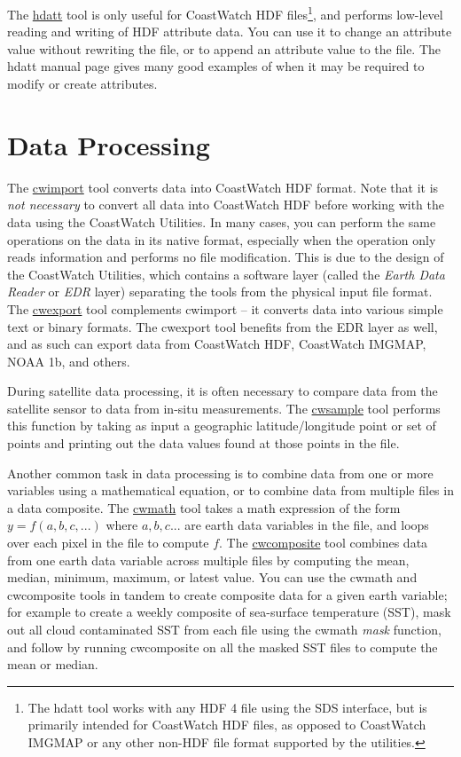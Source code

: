 The \hyperlink{hdatt}{hdatt} tool is only useful for CoastWatch HDF
files\footnote{The hdatt tool works with any HDF 4 file using the
SDS interface, but is primarily intended for CoastWatch HDF files,
as opposed to CoastWatch IMGMAP or any other non-HDF file format
supported by the utilities.}, and performs low-level reading and
writing of HDF attribute data.  You can use it to change an attribute
value without rewriting the file, or to append an attribute value
to the file.  The hdatt manual page gives many good examples of
when it may be required to modify or create attributes.

\section{Data Processing}
\label{processing}

The \hyperlink{cwimport}{cwimport} tool converts data into CoastWatch
HDF format.  Note that it is {\em not necessary} to convert all
data into CoastWatch HDF before working with the data using the
CoastWatch Utilities.  In many cases, you can perform the same
operations on the data in its native format, especially when the
operation only reads information and performs no file modification.
This is due to the design of the CoastWatch Utilities, which contains
a software layer (called the {\em Earth Data Reader} or {\em EDR}
layer) separating the tools from the physical input file format.
The \hyperlink{cwexport}{cwexport} tool complements cwimport -- it
converts data into various simple text or binary formats.  The
cwexport tool benefits from the EDR layer as well, and as such can
export data from CoastWatch HDF, CoastWatch IMGMAP, NOAA 1b, and
others.

During satellite data processing, it is often necessary to compare data
from the satellite sensor to data from in-situ measurements.  The
\hyperlink{cwsample}{cwsample} tool performs this function by taking
as input a geographic latitude/longitude point or set of points and
printing out the data values found at those points in the file.

Another common task in data processing is to combine data from one
or more variables using a mathematical equation, or to combine data
from multiple files in a data composite.  The \hyperlink{cwmath}{cwmath}
tool takes a math expression of the form $y = f(a,b,c,...)$ where
$a,b,c...$ are earth data variables in the file, and loops over
each pixel in the file to compute $f$.  The
\hyperlink{cwcomposite}{cwcomposite} tool combines data from one
earth data variable across multiple files by computing the mean,
median, minimum, maximum, or latest value.  You can use the cwmath
and cwcomposite tools in tandem to create composite data for a given
earth variable; for example to create a weekly composite of sea-surface
temperature (SST), mask out all cloud contaminated SST from each
file using the cwmath {\em mask} function, and follow by running
cwcomposite on all the masked SST files to compute the mean or
median.


